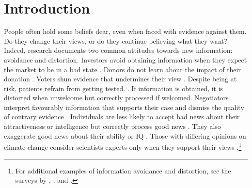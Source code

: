 

\section{Introduction}\label{sec:intro}

People often hold some beliefs dear, even when faced with evidence against them. Do they change their views, or do they continue believing what they want? Indeed, research documents two common attitudes towards new information: avoidance and distortion. Investors avoid obtaining information when they expect the market to be in a bad state \citep{karlssonOstrichEffectSelective2009,sichermanFinancialAttention2016}. Donors do not learn about the impact of their donation \citep{andreoniAvoidingAskField2017,chanAvoidingPeerInformation2024}. Voters shun evidence that undermines their view \citep{gentzkowWhatDrivesMedia2010,bakshyExposureIdeologicallyDiverse2015}. Despite being at risk, patients refrain from getting tested. \citep{thorntonDemandImpactLearning2008,osterOptimalExpectationsLimited2013}. If information is obtained, it is distorted when unwelcome but correctly processed if welcomed. Negotiators interpret favourably information that supports their case and dismiss the quality of contrary evidence \citep{babcockBiasedJudgmentsFairness1995}. Individuals are less likely to accept bad news about their attractiveness or intelligence but correctly process good news \citep{eilGoodNewsbadNews2011}. They also exaggerate good news about their ability or IQ \citep{mobiusManagingSelfConfidenceTheory2022,drobnerMotivatedBeliefUpdating2024}. Those with differing opinions on climate change consider scientists experts only when they support their views \citep{kahanPolarizingImpactScience2012}.\footnote{For additional examples of information avoidance and distortion, see the surveys by \cite{danielOverconfidentInvestorsPredictable2015}, \cite{benabou2016mindful}, and \cite{golmanInformationAvoidance2017}.}

